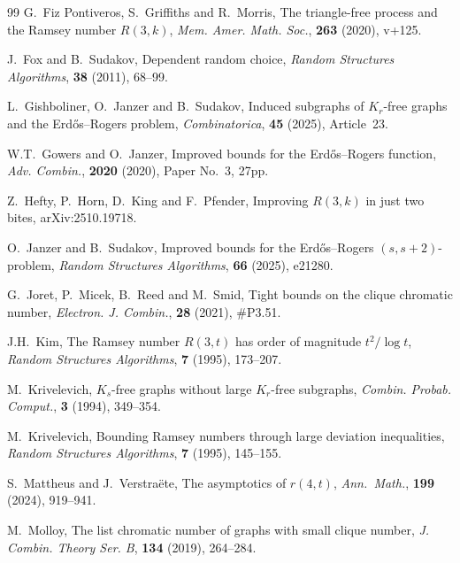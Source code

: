 \documentclass[12pt,reqno]{amsart}
\theoremstyle{remark}
\numberwithin{theorem}{section}
\renewcommand{\(}{\bigl(}
\renewcommand{\)}{\bigr)\vphantom{)}}
\begin{document}
\begin{thebibliography}{99}
 G.~Fiz Pontiveros, S.~Griffiths and R.~Morris, The triangle-free process and the Ramsey number $R(3,k)$, \emph{Mem. Amer. Math. Soc.}, \textbf{263} (2020), v+125.

 J.~Fox and B.~Sudakov, Dependent random choice, \emph{Random Structures Algorithms}, \textbf{38} (2011), 68--99.

 L.~Gishboliner, O.~Janzer and B.~Sudakov, Induced subgraphs of $K_r$-free graphs and the Erd\H{o}s--Rogers problem, \emph{Combinatorica}, \textbf{45} (2025), Article~23.

 W.T.~Gowers and O.~Janzer, Improved bounds for the Erd\H{o}s--Rogers function, \emph{Adv. Combin.}, \textbf{2020} (2020), Paper No.~3, 27pp.


 Z.~Hefty, P.~Horn, D.~King and F.~Pfender, Improving $R(3,k)$ in just two bites, arXiv:2510.19718.

 O.~Janzer and B.~Sudakov, Improved bounds for the Erd\H{o}s--Rogers $(s,s+2)$-problem, \emph{Random Structures Algorithms}, \textbf{66} (2025), e21280.

 G.~Joret, P.~Micek, B.~Reed and M.~Smid, Tight bounds on the clique chromatic number, \emph{Electron. J. Combin.}, \textbf{28} (2021), \#P3.51.

 J.H.~Kim, The Ramsey number $R(3,t)$ has order of magnitude $t^2/\log t$, \emph{Random Structures Algorithms}, \textbf{7} (1995), 173--207.

 M.~Krivelevich, $K_s$-free graphs without large $K_r$-free subgraphs, \emph{Combin. Probab. Comput.}, \textbf{3} (1994), 349--354.

 M.~Krivelevich, Bounding Ramsey numbers through large deviation inequalities, \emph{Random Structures Algorithms}, \textbf{7} (1995), 145--155.


 S.~Mattheus and J.~Verstra\"ete, The asymptotics of $r(4,t)$, \emph{Ann.~Math.}, \textbf{199} (2024), 919--941.

 M.~Molloy, The list chromatic number of graphs with small clique number, \emph{J. Combin. Theory Ser. B}, \textbf{134} (2019), 264--284.


\end{thebibliography}
\end{document}
